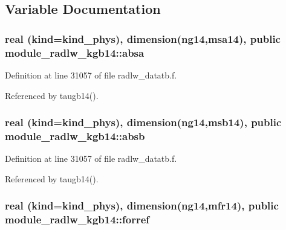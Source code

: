 \subsection{Variable Documentation}
\subsubsection[{\texorpdfstring{absa}{absa}}]{\setlength{\rightskip}{0pt plus 5cm}real (kind=kind\+\_\+phys), dimension(ng14,{\bf msa14}), public module\+\_\+radlw\+\_\+kgb14\+::absa}\hypertarget{namespacemodule__radlw__kgb14_ab57cb029ede27280bc99641f39ab3a81}{}\label{namespacemodule__radlw__kgb14_ab57cb029ede27280bc99641f39ab3a81}


Definition at line 31057 of file radlw\+\_\+datatb.\+f.



Referenced by taugb14().

\subsubsection[{\texorpdfstring{absb}{absb}}]{\setlength{\rightskip}{0pt plus 5cm}real (kind=kind\+\_\+phys), dimension(ng14,{\bf msb14}), public module\+\_\+radlw\+\_\+kgb14\+::absb}\hypertarget{namespacemodule__radlw__kgb14_aa7a122319c49f3c1e8d51d21771cb63d}{}\label{namespacemodule__radlw__kgb14_aa7a122319c49f3c1e8d51d21771cb63d}


Definition at line 31057 of file radlw\+\_\+datatb.\+f.



Referenced by taugb14().

\subsubsection[{\texorpdfstring{forref}{forref}}]{\setlength{\rightskip}{0pt plus 5cm}real (kind=kind\+\_\+phys), dimension(ng14,{\bf mfr14}), public module\+\_\+radlw\+\_\+kgb14\+::forref}\hypertarget{namespacemodule__radlw__kgb14_a8478067cb8a07a02b56c09fa3c73eb67}{}\label{namespacemodule__radlw__kgb14_a8478067cb8a07a02b56c09fa3c73eb67}


